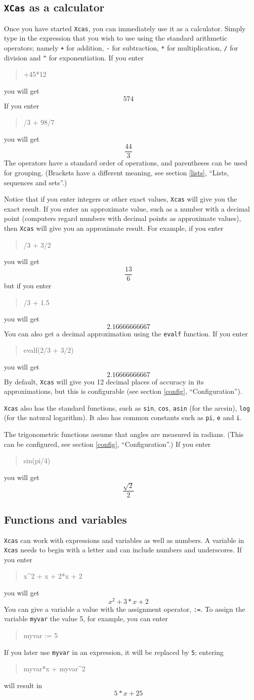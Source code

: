 \documentclass{article}
\newcommand{\xcasin}[1]
{\begin{quote}\ttfamily
#1
\end{quote}}
\newcommand{\xcasout}[1]
{\begin{equation*}
#1
\end{equation*}}
\begin{document}
\subsection{\texttt{XCas} as a calculator}

Once you have started \texttt{Xcas}, you can immediately use it as a
calculator.  Simply type in the expression that you wish to
use using the standard arithmetic operators; namely \texttt{+} for
addition, \texttt{-} for subtraction, \texttt{*} for multiplication,
\texttt{/} for division and \texttt{\^{}} for exponentiation.
If you enter
\xcasin{34+45*12}
you will get
\xcasout{574}
If you enter
\xcasin{2/3 + 98/7}
you will get
\xcasout{\frac{44}{3}}
The operators have a standard order of operations, and parentheses
can be used for grouping.  (Brackets have a different meaning, see
section \ref{lists}, ``Lists, sequences and sets''.)

Notice that if you enter integers or other exact 
values,
\texttt{Xcas} will give you the exact result.  If you enter an
approximate value, such as a number with a decimal point (computers
regard numbers with decimal points as approximate values), then
\texttt{Xcas} will give you an approximate 
result.  For example, if
you enter
\xcasin{2/3 + 3/2}
you will get
\xcasout{\frac{13}{6}}
but if you enter
\xcasin{2/3 + 1.5}
you will get
\xcasout{2.16666666667}
You can also get a decimal approximation using the \texttt{evalf}
function.  If you enter
\xcasin{evalf(2/3 + 3/2)}
you will get
\xcasout{2.16666666667}
By default, \texttt{Xcas} will give you 12 decimal places of accuracy
in its approximations, but this is configurable (see section
\ref{config}, ``Configuration'').

\texttt{Xcas} also has the standard functions, such as
\texttt{sin}, \texttt{cos}, \texttt{asin} (for the arcsin),
\texttt{log} (for the natural logarithm).
It also has common constants such as \texttt{pi}, \texttt{e} and \texttt{i}.

The trigonometric functions assume that angles are measured in
radians.  (This can be configured, see section \ref{config},
``Configuration''.)  If you enter
\xcasin{sin(pi/4)}
you will get
\xcasout{\frac{\sqrt{2}}{2}}

\subsection{Functions and variables}

\texttt{Xcas} can work with expressions and variables as well as 
numbers.
A variable in \texttt{Xcas} needs to begin with a letter and can
include numbers and underscores. If you enter
\xcasin{x\^{}2 + x + 2*x + 2}
you will get
\xcasout{x^2 + 3*x + 2}
You can give a variable a value with the assignment operator,
\texttt{:=}.  To assign the variable
\texttt{myvar} the value 5, for example, you can enter
\xcasin{myvar := 5}
If you later use \texttt{myvar} in an expression, it will be replaced
by \texttt{5}; entering
\xcasin{myvar*x + myvar\^{}2}
will result in
\xcasout{5*x + 25}
\end{document}
